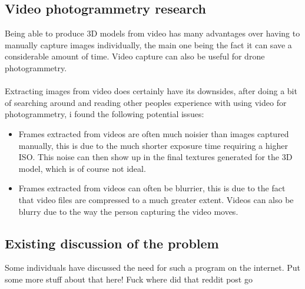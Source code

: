 \documentclass[11pt]{report}
\begin{document}
\subsection{Video photogrammetry research}
Being able to produce 3D models from video has many advantages over having to manually capture images individually, the main one being the fact it can save a considerable amount of time. Video capture can also be useful for drone photogrammetry.\\\\
Extracting images from video does certainly have its downsides, after doing a bit of searching around and reading other peoples experience with using video for photogrammetry, i found the following potential issues:
\begin{itemize}
\item Frames extracted from videos are often much noisier than images captured manually, this is due to the much shorter exposure time requiring a higher ISO. This noise can then show up in the final textures generated for the 3D model, which is of course not ideal.
\item Frames extracted from videos can often be blurrier, this is due to the fact that video files are compressed to a much greater extent. Videos can also be blurry due to the way the person capturing the video moves.
\end{itemize}

\subsection{Existing discussion of the problem}
Some individuals have discussed the need for such a program on the internet. Put some more stuff about that here!
Fuck where did that reddit post go
\end{document}
